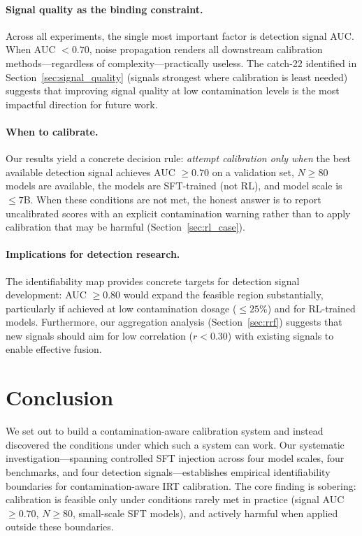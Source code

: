 \documentclass[letterpaper, 10pt, twocolumn]{article}
\begin{document}
\paragraph{Signal quality as the binding constraint.}
Across all experiments, the single most important factor is detection signal AUC.
When AUC $< 0.70$, noise propagation renders all downstream calibration methods---regardless of complexity---practically useless.
The catch-22 identified in Section~\ref{sec:signal_quality} (signals strongest where calibration is least needed) suggests that improving signal quality at low contamination levels is the most impactful direction for future work.

\paragraph{When to calibrate.}
Our results yield a concrete decision rule: \emph{attempt calibration only when} the best available detection signal achieves AUC $\geq 0.70$ on a validation set, $N \geq 80$ models are available, the models are SFT-trained (not RL), and model scale is $\leq 7$B.
When these conditions are not met, the honest answer is to report uncalibrated scores with an explicit contamination warning rather than to apply calibration that may be harmful (Section~\ref{sec:rl_case}).

\paragraph{Implications for detection research.}
The identifiability map provides concrete targets for detection signal development: AUC $\geq 0.80$ would expand the feasible region substantially, particularly if achieved at low contamination dosage ($\leq 25\%$) and for RL-trained models.
Furthermore, our aggregation analysis (Section~\ref{sec:rrf}) suggests that new signals should aim for low correlation ($r < 0.30$) with existing signals to enable effective fusion.

\section{Conclusion}

We set out to build a contamination-aware calibration system and instead discovered the conditions under which such a system can work.
Our systematic investigation---spanning controlled SFT injection across four model scales, four benchmarks, and four detection signals---establishes empirical identifiability boundaries for contamination-aware IRT calibration.
The core finding is sobering: calibration is feasible only under conditions rarely met in practice (signal AUC $\geq 0.70$, $N \geq 80$, small-scale SFT models), and actively harmful when applied outside these boundaries.
\end{document}
